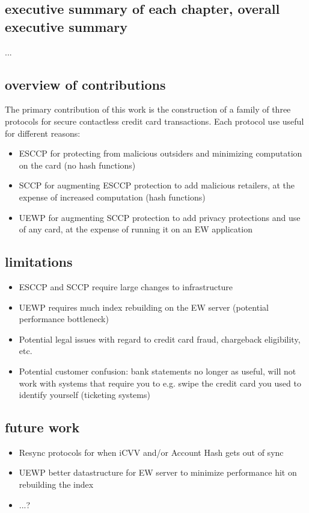 \subsection*{executive summary of each chapter, overall executive summary}
...

\subsection*{overview of contributions}
The primary contribution of this work is the construction of a family of three protocols for secure contactless credit card transactions.
Each protocol use useful for different reasons:
\begin{itemize}
    \item ESCCP for protecting from malicious outsiders and minimizing computation on the card (no hash functions)
    \item SCCP for augmenting ESCCP protection to add malicious retailers, at the expense of increased computation (hash functions)
    \item UEWP for augmenting SCCP protection to add privacy protections and use of any card, at the expense of running it on an EW application
\end{itemize}

\subsection*{limitations}
\begin{itemize}
    \item ESCCP and SCCP require large changes to infrastructure
    \item UEWP requires much index rebuilding on the EW server (potential performance bottleneck)
    \item Potential legal issues with regard to credit card fraud, chargeback eligibility, etc.
    \item Potential customer confusion:
        bank statements no longer as useful,
        will not work with systems that require you to e.g. swipe the credit card you used to identify yourself (ticketing systems)
\end{itemize}

\subsection*{future work}
\begin{itemize}
    \item Resync protocols for when iCVV and/or Account Hash gets out of sync
    \item UEWP better datastructure for EW server to minimize performance hit on rebuilding the index
    \item ...?
\end{itemize}